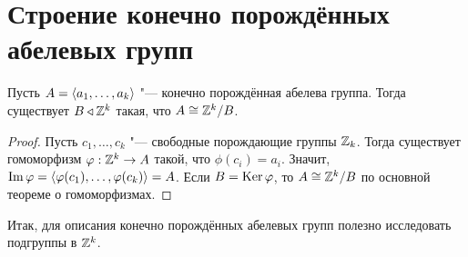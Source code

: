 \documentclass[main]{subfiles}
\begin{document}
\section{Строение конечно порождённых абелевых групп}
\begin{corollary}
  Пусть \( A = \GenGroup{a_1, \dots, a_k} \) "---
  конечно порождённая абелева группа.
  Тогда существует \( B \triangleleft \mathbb{Z}^k \)
  такая, что \( A \cong \Factor{\Integer^k}[B] \).
\end{corollary}
\begin{proof}
  Пусть \( c_1, \dots, c_k \) "--- свободные порождающие группы
  \( \mathbb{Z}_k \). Тогда существует гомоморфизм
  \( \varphi : \mathbb{Z}^k \to A \) такой, что \( \phi(c_i) = a_i \).
  Значит, \( \operatorname{Im} \varphi = \langle \varphi(c_1), \dots, \varphi(c_k) \rangle = A \).
  Если \( B = \operatorname{Ker} \varphi \), то \( A \cong \Factor{\Integer^k}[B] \) по
  основной теореме о гомоморфизмах.
\end{proof}

Итак, для описания конечно порождённых абелевых групп
полезно исследовать подгруппы в \( \mathbb{Z}^k \).
\end{document}
